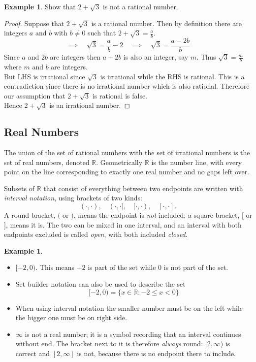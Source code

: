 \documentclass[11pt,a4paper]{article}
\theoremstyle{definition}
\newtheorem{example}[thm]{Example}
\begin{document}
\begin{example}

Show that $2+\sqrt{3}$ is not a rational number.
\end{example}
\begin{proof}

Suppose that $2+\sqrt{3}$ is a rational number. Then by definition there are integers $a$ and $b$ with $b\neq 0$ such that $2+\sqrt{3}=\frac{a}{b}$.$$\implies \quad  \sqrt{3}=\frac{a}{b}-2\quad  \implies \quad \sqrt{3}=\frac{a-2b}{b}$$
Since $a$ and $2b$ are integers then $a-2b$ is also an integer, say $m$. Thus $\sqrt{3}=\frac{m}{b}$ where $m$ and $b$ are integers.\\
But LHS is irrational since $\sqrt{3}$ is irrational while the RHS is rational. This is a contradiction since there is no irrational number which is also rational.
Therefore our assumption that $2+\sqrt{3}$ is rational is false.\\ Hence $2+\sqrt{3}$ is an irrational number.
\end{proof}
\subsection{Real Numbers}
The union of the set of rational numbers with the set of irrational numbers is the
set of real numbers, denoted $\mathbb{R}$. Geometrically $\mathbb{R}$ is the number
line, with every point on the line corresponding to exactly one real number and
no gaps left over.

Subsets of $\mathbb{R}$ that consist of everything between two endpoints are
written with \emph{interval notation}, using brackets of two kinds:
$$(\cdot,\cdot),\quad (\cdot,\cdot],\quad [\cdot,\cdot),\quad [\cdot,\cdot].$$
A round bracket, $($ or $)$, means the endpoint is \emph{not} included; a square
bracket, $[$ or $]$, means it is. The two can be mixed in one interval, and an
interval with both endpoints excluded is called \emph{open}, with both included
\emph{closed}.






\pagebreak
\begin{example}

\begin{itemize}
\item $[-2,0)$. This means $-2$ is part of the set while 0 is not part of the set.
\item Set builder notation can also be used to describe the set $$[-2,0)=\{x\in \mathbb{R}:-2\leq x<0\}$$
\item When using interval notation the smaller number must be on the left while the bigger one must be on right side.
\item $\infty$ is not a real number; it is a symbol recording that an interval
continues without end. The bracket next to it is therefore \emph{always} round:
$[2,\infty)$ is correct and $[2,\infty]$ is not, because there is no endpoint
there to include.
\end{itemize}
\end{example}
\end{document}
